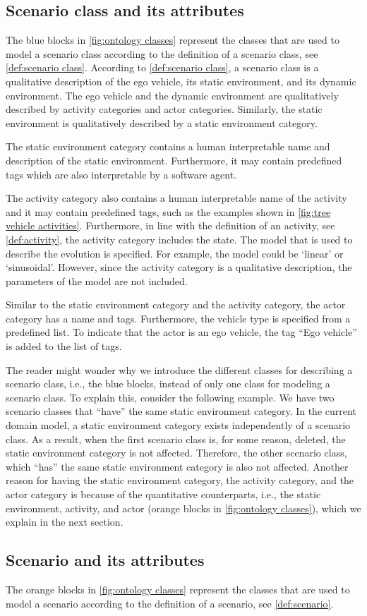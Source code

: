 \subsection{Scenario class and its attributes}
\label{sec:domain scenario class}

The blue blocks in \cref{fig:ontology classes} represent the classes that are used to model a scenario class according to the definition of a scenario class, see \cref{def:scenario class}. According to \cref{def:scenario class}, a scenario class is a qualitative description of the ego vehicle, its static environment, and its dynamic environment. The ego vehicle and the dynamic environment are qualitatively described by activity categories and actor categories. Similarly, the static environment is qualitatively described by a static environment category. 

The static environment category contains a human interpretable name and description of the static environment. Furthermore, it may contain predefined tags which are also interpretable by a software agent. 

The activity category also contains a human interpretable name of the activity and it may contain predefined tags, such as the examples shown in \cref{fig:tree vehicle activities}. Furthermore, in line with the definition of an activity, see \cref{def:activity}, the activity category includes the state.  The model that is used to describe the evolution is specified. For example, the model could be `linear' or `sinusoidal'. However, since the activity category is a qualitative description, the parameters of the model are not included.

Similar to the static environment category and the activity category, the actor category has a name and tags. Furthermore, the vehicle type is specified from a predefined list. To indicate that the actor is an ego vehicle, the tag ``Ego vehicle'' is added to the list of tags.

The reader might wonder why we introduce the different classes for describing a scenario class, i.e., the blue blocks, instead of only one class for modeling a scenario class. To explain this, consider the following example. We have two scenario classes that ``have'' the same static environment category. In the current domain model, a static environment category exists independently of a scenario class. As a result, when the first scenario class is, for some reason, deleted, the static environment category is not affected. Therefore, the other scenario class, which ``has'' the same static environment category is also not affected. Another reason for having the static environment category, the activity category, and the actor category is because of the quantitative counterparts, i.e., the static environment, activity, and actor (orange blocks in \cref{fig:ontology classes}), which we explain in the next section.



\subsection{Scenario and its attributes}
\label{sec:domain scenario}

The orange blocks in \cref{fig:ontology classes} represent the classes that are used to model a scenario according to the definition of a scenario, see \cref{def:scenario}. 

\cbend


